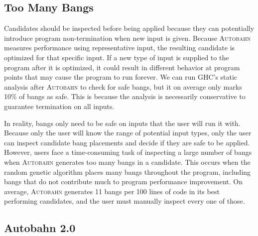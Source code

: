 \documentclass[format=sigplan, review=true]{acmart}
\begin{document}
\subsection{Too Many Bangs}

Candidates should be inspected before being applied because they can potentially introduce program non-termination when new input is given. Because \textsc{Autobahn} measures performance using representative input, the resulting candidate is optimized for that specific input. If a new type of input is supplied to the program after it is optimized, it could result in different behavior at program points that may cause the program to run forever. We can run GHC's static analysis after \textsc{Autobahn} to check for safe bangs, but it on average only marks 10\% of bangs as safe. This is because the analysis is necessarily conservative to guarantee termination on all inputs. 

In reality, bangs only need to be safe on inputs that the user will run it with. 
Because only the user will know the range of potential input types, only the user can inspect candidate bang placements and decide if they are safe to be applied. However, users face a time-consuming task of inspecting a large number of bangs when \textsc{Autobahn} generates too many bangs in a candidate. This occurs when the random genetic algorithm places many bangs throughout the program, including bangs that do not contribute much to program performance improvement. On average, \textsc{Autobahn} generates 11 bangs per 100 lines of code in its best performing candidates, and the user must manually inspect every one of those.   

\subsection{Autobahn 2.0}
\end{document}
